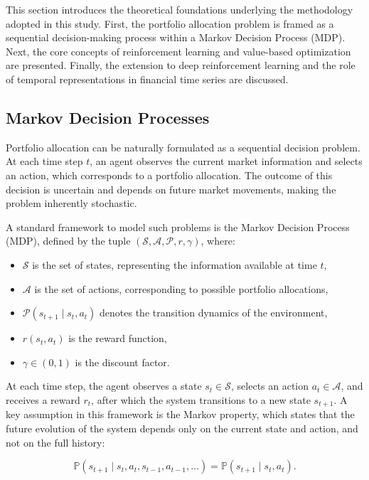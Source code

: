 \documentclass[]{elsarticle}
\begin{document}
This section introduces the theoretical foundations underlying the methodology adopted in this study. First, the portfolio allocation problem is framed as a sequential decision-making process within a Markov Decision Process (MDP). Next, the core concepts of reinforcement learning and value-based optimization are presented. Finally, the extension to deep reinforcement learning and the role of temporal representations in financial time series are discussed.

\hypertarget{MDP}{%
\subsection{Markov Decision Processes}\label{MDP}}

Portfolio allocation can be naturally formulated as a sequential decision problem. At each time step \(t\), an agent observes the current market information and selects an action, which corresponds to a portfolio allocation. The outcome of this decision is uncertain and depends on future market movements, making the problem inherently stochastic.

A standard framework to model such problems is the Markov Decision Process (MDP), defined by the tuple \((\mathcal{S}, \mathcal{A}, \mathcal{P}, r, \gamma)\), where:
\begin{itemize}
    \item \(\mathcal{S}\) is the set of states, representing the information available at time \(t\),
    \item \(\mathcal{A}\) is the set of actions, corresponding to possible portfolio allocations,
    \item \(\mathcal{P}(s_{t+1} \mid s_t, a_t)\) denotes the transition dynamics of the environment,
    \item \(r(s_t, a_t)\) is the reward function,
    \item \(\gamma \in (0,1)\) is the discount factor.
\end{itemize}

At each time step, the agent observes a state \(s_t \in \mathcal{S}\), selects an action \(a_t \in \mathcal{A}\), and receives a reward \(r_t\), after which the system transitions to a new state \(s_{t+1}\). A key assumption in this framework is the Markov property, which states that the future evolution of the system depends only on the current state and action, and not on the full history:

\begin{equation}
\mathbb{P}(s_{t+1} \mid s_t, a_t, s_{t-1}, a_{t-1}, \dots) 
= 
\mathbb{P}(s_{t+1} \mid s_t, a_t).
\end{equation}
\end{document}
